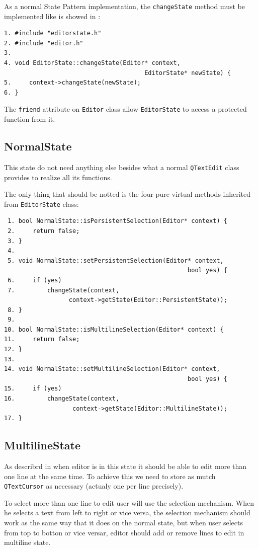 \documentclass[11pt,a4paper]{report}
\begin{document}
As a normal State Pattern implementation, the \texttt{changeState} method must be implemented like is showed in \cite{designPatterns}:

\begin{verbatim}
1. #include "editorstate.h"
2. #include "editor.h"
3. 
4. void EditorState::changeState(Editor* context, 
                                       EditorState* newState) {
5.     context->changeState(newState);
6. }
\end{verbatim}

The \texttt{friend} attribute on \texttt{Editor} class allow \texttt{EditorState} to access a protected function from it.

\subsection{NormalState}
This state do not need anything else besides what a normal \texttt{QTextEdit} class provides to realize all its functions.

The only thing that should be notted is the four pure virtual methods inherited from \texttt{EditorState} class:

\begin{verbatim}
 1. bool NormalState::isPersistentSelection(Editor* context) {
 2.     return false;
 3. }
 4.
 5. void NormalState::setPersistentSelection(Editor* context, 
                                                   bool yes) {
 6.     if (yes)
 7.         changeState(context, 
                  context->getState(Editor::PersistentState));
 8. }
 9.
10. bool NormalState::isMultilineSelection(Editor* context) {
11.     return false;
12. }
13.
14. void NormalState::setMultilineSelection(Editor* context, 
                                                   bool yes) {
15.     if (yes)
16.         changeState(context, 
                   context->getState(Editor::MultilineState));
17. }
\end{verbatim}

\subsection{MultilineState}
As describrd in \cite{functional} when editor is in this state it should be able to edit more than one line at the same time. To achieve this we need to store as mutch \texttt{QTextCursor} as necessary (actualy one per line precisely).

To select more than one line to edit user will use the selection mechanism. When he selects a text from left to right or vice versa, the selection mechanism should work as the same way that it does on the normal state, but when user selects from top to botton or vice versar, editor should add or remove lines to edit in multiline state.
\end{document}
